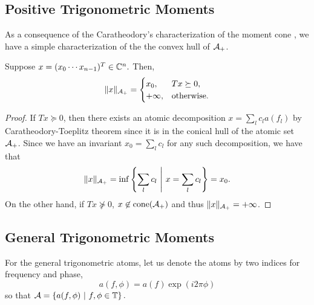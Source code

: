 \subsection{Positive Trigonometric Moments} %
\label{sub:positive_trigonometric_moments}

As a consequence of the Caratheodory's characterization of the moment cone , we have a simple characterization of the the convex hull of $\mathcal{A}_+$.

\begin{theorem}
Suppose $x = (x_0 \cdots x_{n-1})^T \in \mathbb{C}^n.$ Then, 
	\[
		\lVert x\rVert_{\mathcal{A}_{+}} = \begin{cases}
			x_0, & T x \succeq 0,\\
			+\infty, & \text{otherwise.}
		\end{cases}
	\]
\end{theorem}
\begin{proof}
If $T x \succeq 0$, then there exists an atomic decomposition $x = \sum_l c_l a(f_l)$ by Caratheodory-Toeplitz theorem since it is in the conical hull of the atomic set $\mathcal{A}_+$. Since we have an invariant $x_0 = \sum_l c_l$ for any such decomposition, we have that
\[
\lVert x\rVert_{\mathcal{A}_{+}}  = \inf\left\{ \sum_l{c_l} ~\middle|~ x = \sum_l c_l \right\} = x_0.
\]
On the other hand, if $Tx \not\succeq 0$, $x \not\in \operatorname{cone}(\mathcal{A}_+)$ and thus $\lVert x\rVert_{\mathcal{A}_{+}} = +\infty$.
\end{proof}


\subsection{General Trigonometric Moments} %
\label{sub:general_trigonometric_moments}

For the general trigonometric atoms, let us denote the atoms by two indices for  frequency and phase,
\[
	a(f,\phi) = a(f) \exp(i 2\pi \phi)
\]
so that $\mathcal{A} = \left\{ a(f,\phi) ~\middle|~ f, \phi \in \mathbb{T} \right\}.$


